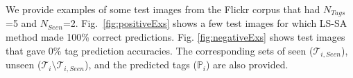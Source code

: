 We provide examples of some test images from the Flickr corpus that had $N_{Tags}$=5 and $N_{Seen}$=2. Fig.~\ref{fig:positiveExs} shows a few test images for which LS-SA method made 100\% correct predictions. Fig. \ref{fig:negativeExs} shows test images that gave 0\% tag prediction accuracies. The corresponding sets of seen ($\mathcal{T}_{i,Seen}$), unseen ($\mathcal{T}_i \setminus  \mathcal{T}_{i,Seen}$), and the predicted tags ($\mathbb{P}_i$) are also provided. 







